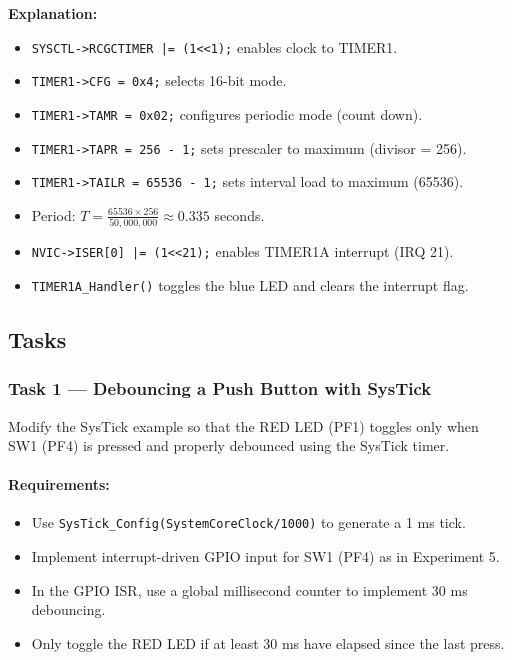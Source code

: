 \noindent
\textbf{Explanation:}
\begin{itemize}[nosep]
  \item \texttt{SYSCTL->RCGCTIMER |= (1<<1);} enables clock to TIMER1.
  \item \texttt{TIMER1->CFG = 0x4;} selects 16-bit mode.
  \item \texttt{TIMER1->TAMR = 0x02;} configures periodic mode (count down).
  \item \texttt{TIMER1->TAPR = 256 - 1;} sets prescaler to maximum (divisor = 256).
  \item \texttt{TIMER1->TAILR = 65536 - 1;} sets interval load to maximum (65536).
  \item Period: $T = \frac{65536 \times 256}{50{,}000{,}000} \approx 0.335$ seconds.
  \item \texttt{NVIC->ISER[0] |= (1<<21);} enables TIMER1A interrupt (IRQ 21).
  \item \texttt{TIMER1A\_Handler()} toggles the blue LED and clears the interrupt flag.
\end{itemize}

\newpage
\subsection{Tasks}

\subsubsection{Task 1 — Debouncing a Push Button with SysTick}

Modify the SysTick example so that the RED LED (PF1) toggles only when SW1 (PF4) is pressed and properly debounced using the SysTick timer.

\paragraph{Requirements:}
\begin{itemize}[nosep]
  \item Use \texttt{SysTick\_Config(SystemCoreClock/1000)} to generate a 1 ms tick.
  \item Implement interrupt-driven GPIO input for SW1 (PF4) as in Experiment 5.
  \item In the GPIO ISR, use a global millisecond counter to implement 30 ms debouncing.
  \item Only toggle the RED LED if at least 30 ms have elapsed since the last press.
\end{itemize}

